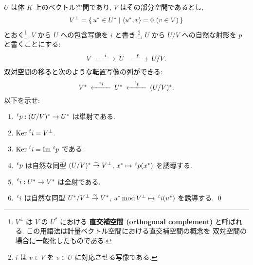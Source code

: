 \documentclass[12pt,twoside]{jarticle}
\begin{document}
\begin{question}[商空間と部分空間の双対, 20点]
  $U$ は体 $K$ 上のベクトル空間であり, $V$ はその部分空間であるとし,
  \begin{equation*}
    V^\bot = \{\, u^*\in U^* \mid \langle u^*,v\rangle = 0 \ (v\in V) \,\}
  \end{equation*}
  とおく\footnote{$V^\bot$ は $V$ の $U^*$ における
    {\bf 直交補空間 (orthogonal complement)} と呼ばれる.
    この用語法は計量ベクトル空間における直交補空間の概念を
    双対空間の場合に一般化したものである.}.
  $V$ から $U$ への包含写像を $i$ と書き%
  \footnote{$i$ は $v\in V$ を $v\in U$ に対応させる写像である.}, 
  $U$ から $U/V$ への自然な射影を $p$ と書くことにする:
  \begin{equation*}
    \begin{CD}
      V @>i>> U @>p>> U/V. \\
    \end{CD}
  \end{equation*}
  双対空間の移ると次のような転置写像の列ができる:
  \begin{equation*}
    \begin{CD}
      V^* @<\tp{i}<< U^* @<\tp{p}<< (U/V)^*.
    \end{CD}
  \end{equation*}
  以下を示せ:
  \begin{enumerate}
  \item $\tp{p}:(U/V)^*\to U^*$ は単射である.
  \item $\Ker\tp{i}=V^\bot$.
  \item $\Ker\tp{i}=\Image\tp{p}$ である.
  \item $\tp{p}$ は自然な同型 $(U/V)^*\overset\sim\rightarrow V^\bot$,
    $x^*\mapsto \tp{p}(x^*)$ を誘導する.
  \item $\tp{i}:U^*\to V^*$ は全射である.
  \item $\tp{i}$ は自然な同型 $U^*/V^\bot \overset\sim\rightarrow V^*$,
    $u^*\MOD V^\bot \mapsto \tp{i}(u^*)$ を誘導する.
    \qed
  \end{enumerate}
\end{question}
\end{document}
